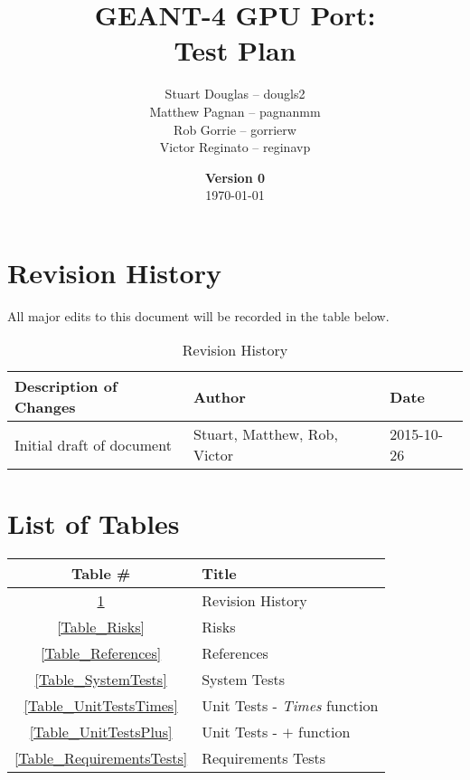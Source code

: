 \documentclass[12pt]{article}
\title{
\LARGE GEANT-4 GPU Port:
\\\vspace{10mm}
\large \textbf{Test Plan}
\vspace{40mm}
}
\author{
Stuart Douglas -- dougls2
\\Matthew Pagnan -- pagnanmm
\\Rob Gorrie -- gorrierw
\\Victor Reginato -- reginavp
\vspace{10mm}
}
\date{\vfill \textbf{Version 0}\\ \today}
\begin{document}

\maketitle
\newpage

\tableofcontents
\newpage
{}
\restoregeometry


\section*{Revision History}
All major edits to this document will be recorded in the table below.

\begin{table}[h]
\centering
\caption{Revision History}\label{Table_Revision}
\begin{tabular}{lll}
\toprule
\bf Description of Changes & \bf Author & \bf Date\\\midrule
Initial draft of document & Stuart, Matthew, Rob, Victor & 2015-10-26\\
\bottomrule
\end{tabular}
\end{table}

\section*{List of Tables}

\begin{center}
\begin{tabular}{cl}
\toprule
\bf Table \# & \bf Title\\\midrule
\ref{Table_Revision} & Revision History\\
\ref{Table_Risks} & Risks\\
\ref{Table_References} & References\\
\ref{Table_SystemTests} & System Tests\\
\ref{Table_UnitTestsTimes} & Unit Tests - \emph{Times} function\\
\ref{Table_UnitTestsPlus} & Unit Tests - $+$ function\\
\ref{Table_RequirementsTests} & Requirements Tests\\
\bottomrule
\end{tabular}
\end{center}
\end{document}
